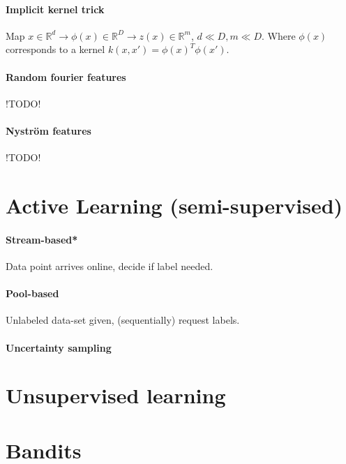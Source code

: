 \documentclass[a4paper, 9pt, DIV=24]{scrartcl}
\newcommand{\R}{\mathbb{R}}
\begin{document}
\begin{twocolumn}
\paragraph{Implicit kernel trick}
Map $x \in \R^d \rightarrow \phi(x) \in \R^D \rightarrow z(x) \in \R^m$, $d \ll D, m \ll D$.
Where $\phi(x)$ corresponds to a kernel $k(x,x') = \phi(x)^T\phi(x')$.

\paragraph{Random fourier features}
!TODO!
\paragraph{Nyström features}
!TODO!

\section{Active Learning (semi-supervised)}
\paragraph{Stream-based*} Data point arrives online, decide if label needed.
\paragraph{Pool-based} Unlabeled data-set given, (sequentially) request labels.

\paragraph{Uncertainty sampling}

\section{Unsupervised learning}


\section{Bandits}

\end{twocolumn}

\appendix
\end{document}
